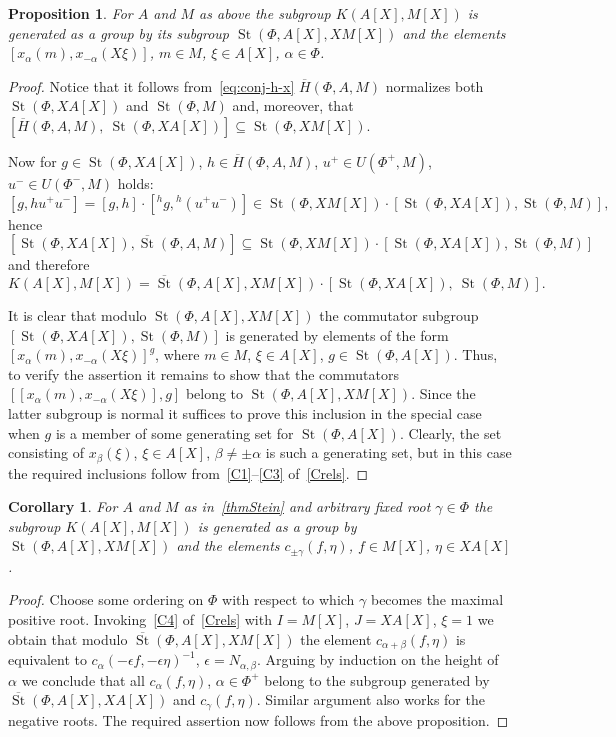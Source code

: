 \documentclass[oneside, 8pt]{amsart}
\newtheorem{prop}{Proposition}
\newtheorem{corollary}{Corollary}
\theoremstyle{remark}
\theoremstyle{definition}
\DeclareMathOperator{\St}{St}
\numberwithin{equation}{section}
\begin{document}
\begin{prop} \label{Kgen}
For $A$ and $M$ as above the subgroup $K(A[X], M[X])$ is generated as a group by its subgroup $\St(\Phi, A[X], XM[X])$ and
 the elements $[x_\alpha(m), x_{-\alpha}(X\xi)]$, $m \in M$, $\xi \in A[X]$, $\alpha \in \Phi$. \end{prop}
\begin{proof}
 Notice that it follows from~\eqref{eq:conj-h-x} $\overline{H}(\Phi, A, M)$ normalizes both $\St(\Phi, XA[X])$ and $\St(\Phi, M)$ and, moreover, that $[\overline{H}(\Phi, A, M),\ \St(\Phi, XA[X])] \subseteq \St(\Phi, XM[X])$. 
 
Now for $g \in \St(\Phi, XA[X])$, $h \in \overline{H}(\Phi, A, M)$, $u^+ \in U(\Phi^+, M)$, $u^- \in U(\Phi^-, M)$ holds:
\[ [g, h u^+ u^-] = [g, h] \cdot [{}^{h}\!g, {}^{h}\!(u^+u^-)] \in \St(\Phi, XM[X]) \cdot [\St(\Phi, XA[X]), \St(\Phi, M)],\]
hence $\left[\St(\Phi, XA[X]), \overline{\St}(\Phi, A, M)\right] \subseteq \St(\Phi, XM[X]) \cdot \left[\St(\Phi, XA[X]), \St(\Phi, M)\right]$ and therefore \[K(A[X], M[X]) = \overline{\St}(\Phi, A[X], XM[X]) \cdot \left[\St(\Phi, XA[X]),\ \St(\Phi, M)\right].\]
 
It is clear that modulo $\St(\Phi, A[X], XM[X])$ the commutator subgroup $[\St(\Phi, XA[X]), \St(\Phi, M)]$ is generated by elements of the form $[x_\alpha(m), x_{-\alpha}(X\xi)]^g$, where $m \in M$, $\xi \in A[X]$, $g \in \St(\Phi, A[X])$.
Thus, to verify the assertion it remains to show that the commutators $[[x_\alpha(m), x_{-\alpha}(X\xi)], g]$ belong to $\St(\Phi, A[X], XM[X])$.
Since the latter subgroup is normal it suffices to prove this inclusion in the special case when $g$ is a member of some generating set for $\St(\Phi, A[X])$.
Clearly, the set consisting of $x_\beta(\xi)$, $\xi \in A[X]$, $\beta \neq \pm \alpha$ is such a generating set, but in this case the required inclusions follow from~\eqref{C1}--\eqref{C3} of~\cref{Crels}. \end{proof}

\begin{corollary} \label{Kgen-strong}
 For $A$ and $M$ as in~\cref{thmStein} and arbitrary fixed root $\gamma\in \Phi$ the subgroup $K(A[X], M[X])$ is generated as a group by $\St(\Phi, A[X], XM[X])$ and the elements $c_{\pm \gamma}(f, \eta)$, $f \in M[X]$, $\eta \in XA[X]$.
\end{corollary}
\begin{proof}
 Choose some ordering on $\Phi$ with respect to which $\gamma$ becomes the maximal positive root. Invoking~\eqref{C4} of~\cref{Crels} with $I = M[X]$, $J=XA[X]$, $\xi = 1$ we obtain that modulo $\overline{\St}(\Phi, A[X], XM[X])$ the element $c_{\alpha + \beta}(f, \eta)$ is equivalent to $c_{\alpha}(-\epsilon f, -\epsilon \eta)^{-1}$, $\epsilon = N_{\alpha, \beta}$. Arguing by induction on the height of $\alpha$ we conclude that all $c_\alpha(f, \eta)$, $\alpha \in \Phi^+$ belong to the subgroup generated by $\overline{\St}(\Phi, A[X], XA[X])$ and $c_\gamma(f, \eta)$. Similar argument also works for the negative roots. The required assertion now follows from the above proposition.
\end{proof}
\end{document}
